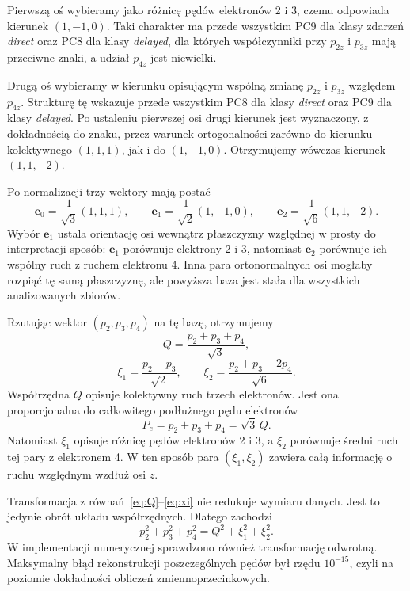 \documentclass[12pt,letterpaper,oneside]{report}
\numberwithin{equation}{chapter}
\numberwithin{figure}{chapter}
\numberwithin{table}{chapter}
\newcommand{\direct}{\textit{direct}}
\newcommand{\delayed}{\textit{delayed}}
\begin{document}
Pierwszą oś wybieramy jako różnicę pędów elektronów 2 i 3, czemu
odpowiada kierunek $(1,-1,0)$. Taki charakter ma przede wszystkim PC9
dla klasy zdarzeń \direct{} oraz PC8 dla klasy \delayed{}, dla których
współczynniki przy $p_{2z}$ i $p_{3z}$ mają przeciwne znaki, a udział
$p_{4z}$ jest niewielki.

Drugą oś wybieramy w kierunku opisującym wspólną zmianę $p_{2z}$ i
$p_{3z}$ względem $p_{4z}$. Strukturę tę wskazuje przede wszystkim PC8
dla klasy \direct{} oraz PC9 dla klasy \delayed{}. Po ustaleniu pierwszej
osi drugi kierunek jest wyznaczony, z dokładnością do znaku, przez
warunek ortogonalności zarówno do kierunku kolektywnego $(1,1,1)$,
jak i do $(1,-1,0)$. Otrzymujemy wówczas kierunek $(1,1,-2)$.

Po normalizacji trzy wektory mają postać
\begin{equation}
\mathbf e_0=\frac{1}{\sqrt3}(1,1,1),\qquad
\mathbf e_1=\frac{1}{\sqrt2}(1,-1,0),\qquad
\mathbf e_2=\frac{1}{\sqrt6}(1,1,-2).
\label{eq:helmert-basis}
\end{equation}
Wybór $\mathbf e_1$ ustala orientację osi wewnątrz płaszczyzny względnej w prosty do interpretacji sposób: $\mathbf e_1$ porównuje elektrony 2 i 3, natomiast $\mathbf e_2$ porównuje ich wspólny ruch z ruchem elektronu 4. Inna para ortonormalnych osi mogłaby rozpiąć tę samą płaszczyznę, ale powyższa baza jest stała dla wszystkich analizowanych zbiorów.

Rzutując wektor $(p_2,p_3,p_4)$ na tę bazę, otrzymujemy
\begin{equation}
Q=\frac{p_2+p_3+p_4}{\sqrt3},
\label{eq:Q}
\end{equation}
\begin{equation}
\xi_1=\frac{p_2-p_3}{\sqrt2},\qquad
\xi_2=\frac{p_2+p_3-2p_4}{\sqrt6}.
\label{eq:xi}
\end{equation}
Współrzędna $Q$ opisuje kolektywny ruch trzech elektronów. Jest ona proporcjonalna do całkowitego podłużnego pędu elektronów
\begin{equation}
P_e=p_2+p_3+p_4=\sqrt3\,Q.
\label{eq:Pe}
\end{equation}
Natomiast $\xi_1$ opisuje różnicę pędów elektronów 2 i 3, a $\xi_2$ porównuje średni ruch tej pary z elektronem 4. W ten sposób para $(\xi_1,\xi_2)$ zawiera całą informację o ruchu względnym wzdłuż osi $z$.

Transformacja z równań~\eqref{eq:Q}--\eqref{eq:xi} nie redukuje wymiaru danych. Jest to jedynie obrót układu współrzędnych. Dlatego zachodzi
\begin{equation}
p_2^2+p_3^2+p_4^2=Q^2+\xi_1^2+\xi_2^2.
\label{eq:norm}
\end{equation}
W implementacji numerycznej sprawdzono również transformację odwrotną. Maksymalny błąd rekonstrukcji poszczególnych pędów był rzędu $10^{-15}$, czyli na poziomie dokładności obliczeń zmiennoprzecinkowych.
\end{document}

